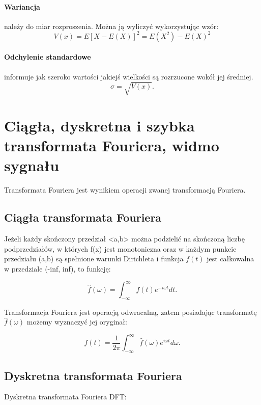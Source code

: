\documentclass[a4paper,twoside]{report}
\begin{document}
\paragraph{Wariancja} należy do miar rozproszenia. Można ją wyliczyć wykorzystując wzór:
\begin{equation}
V(x) = E[X - E(X)]^2 = E(X^2)-E(X)^2
\end{equation}
\medskip

\paragraph{Odchylenie standardowe} informuje jak szeroko wartości jakiejś wielkości są rozrzucone wokół jej średniej. 
\begin{equation}
\sigma = \sqrt{V(x)}.
\end{equation}



\section{Ciągła, dyskretna i szybka transformata Fouriera, widmo sygnału}
Transformata Fouriera jest wynikiem operacji zwanej transformacją Fouriera.
\subsection{Ciągła transformata Fouriera}
Jeżeli każdy skończony przedział <a,b> można podzielić na skończoną    liczbę    podprzedziałów,    w    których f(x) jest monotoniczna   oraz   w   każdym   punkcie   przedziału (a,b) są spełnione  warunki  Dirichleta  i  funkcja $f(t)$ jest  całkowalna  w przedziale (-inf, inf), to funkcję:

\begin{equation}
\hat{f}(\omega)=\int_{-\infty }^{\infty}f(t) e^{-i\omega t}dt .
\end{equation}

Transformacja   Fouriera   jest   operacją   odwracalną,   zatem posiadając transformatę $\hat{f}(\omega)$ możemy wyznaczyć jej oryginał:

\begin{equation}
f(t)= \dfrac{1}{2\pi} \int_{-\infty }^{\infty}\hat{f}(\omega) e^{i\omega t}d\omega .
\end{equation}

\subsection{Dyskretna transformata Fouriera}
Dyskretna transformata Fouriera DFT:
\end{document}
